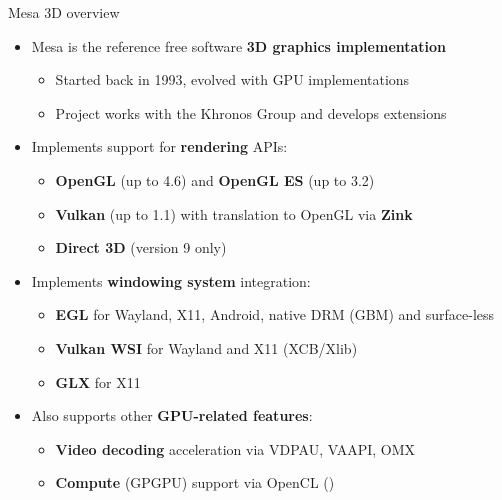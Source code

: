 \begin{frame}{Mesa 3D overview}
  \begin{itemize}
  \item Mesa is the reference free software \textbf{3D graphics implementation}
    \begin{itemize}
    \item Started back in 1993, evolved with GPU implementations
    \item Project works with the Khronos Group and develops extensions
    \end{itemize}
  \item Implements support for \textbf{rendering} APIs:
    \begin{itemize}
    \item \textbf{OpenGL} (up to 4.6) and \textbf{OpenGL ES} (up to 3.2)
    \item \textbf{Vulkan} (up to 1.1) with translation to OpenGL via \textbf{Zink}
    \item \textbf{Direct 3D} (version 9 only)
    \end{itemize}
  \item Implements \textbf{windowing system} integration:
    \begin{itemize}
    \item \textbf{EGL} for Wayland, X11, Android, native DRM (GBM) and surface-less
    \item \textbf{Vulkan WSI} for Wayland and X11 (XCB/Xlib)
    \item \textbf{GLX} for X11
    \end{itemize}
  \item Also supports other \textbf{GPU-related features}:
    \begin{itemize}
    \item \textbf{Video decoding} acceleration via VDPAU, VAAPI, OMX
    \item \textbf{Compute} (GPGPU) support via OpenCL ()
    \end{itemize}
  \end{itemize}
\end{frame}

